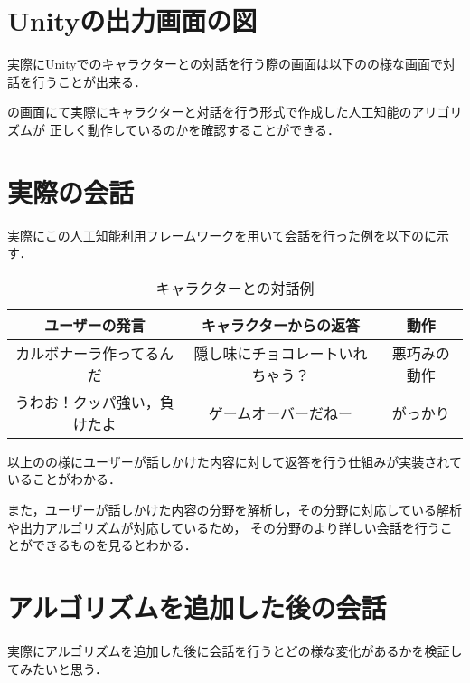 
\section{Unityの出力画面の図}
実際にUnityでのキャラクターとの対話を行う際の画面は以下のの様な画面で対話を行うことが出来る．


の画面にて実際にキャラクターと対話を行う形式で作成した人工知能のアリゴリズムが
正しく動作しているのかを確認することができる．


\section{実際の会話}
実際にこの人工知能利用フレームワークを用いて会話を行った例を以下のに示す．

\begin{table}[tbh]
	\caption{キャラクターとの対話例} \label{tab:Chat}
	\begin{center}
		\begin{tabular}[htb]{c|c|c}
		\hline
		ユーザーの発言 & キャラクターからの返答 & 動作 \\
		\hline
		カルボナーラ作ってるんだ & 隠し味にチョコレートいれちゃう？ & 悪巧みの動作 \\
		うわお！クッパ強い，負けたよ & ゲームオーバーだねー & がっかり \\
		\hline
		\end{tabular}
	\end{center}
\end{table}

以上のの様にユーザーが話しかけた内容に対して返答を行う仕組みが実装されていることがわかる．

また，ユーザーが話しかけた内容の分野を解析し，その分野に対応している解析や出力アルゴリズムが対応しているため，
その分野のより詳しい会話を行うことができるものを見るとわかる．


\section{アルゴリズムを追加した後の会話}\label{sec:addAl}
実際にアルゴリズムを追加した後に会話を行うとどの様な変化があるかを検証してみたいと思う．

